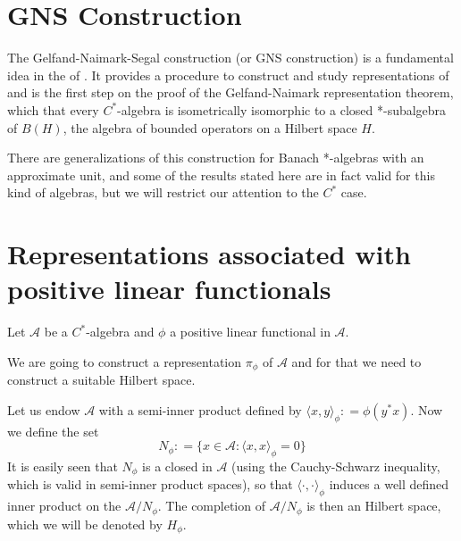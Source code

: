 \documentclass[12pt]{article}
\begin{document}

\section{GNS Construction}

The Gelfand-Naimark-Segal construction (or GNS construction) is a fundamental idea in the  of  . It provides a procedure to construct and study representations of  and is the first step on the proof of the Gelfand-Naimark representation theorem, which  that every $C^*$-algebra is isometrically isomorphic to a closed *-subalgebra of $B(H)$, the algebra of bounded operators on a Hilbert space $H$.

There are generalizations of this construction for Banach *-algebras with an approximate unit, and some of the results stated here are in fact valid for this kind of algebras, but we will restrict our attention to the $C^*$ case.

\section{Representations associated with positive linear functionals}

Let $\mathcal{A}$ be a $C^*$-algebra and $\phi$ a positive linear functional in $\mathcal{A}$.

We are going to construct a representation $\pi_{\phi}$ of $\mathcal{A}$ and for that we need to construct a suitable Hilbert space.

Let us endow $\mathcal{A}$ with a semi-inner product defined by $\langle x, y \rangle_{\phi} : = \phi(y^*x)$. Now we define the set
\begin{displaymath}
N_{\phi} : = \{ x \in \mathcal{A}: \langle x , x \rangle_{\phi}=0 \}
\end{displaymath}
It is easily seen that $N_{\phi}$ is a closed  in $\mathcal{A}$ (using the Cauchy-Schwarz inequality, which is valid in semi-inner product spaces), so that $\langle \cdot, \cdot \rangle_{\phi}$ induces a well defined inner product on the  $\mathcal{A}/N_{\phi}$. The completion of $\mathcal{A}/N_{\phi}$ is then an Hilbert space, which we will be denoted by $H_{\phi}$.
\end{document}
